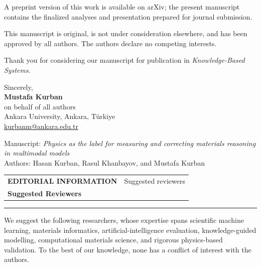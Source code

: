 \documentclass[10pt,a4paper]{article}
\newcommand{\smallcapslabel}[1]{%
  {\fontsize{8.4}{10}\selectfont\bfseries\color{Teal}\MakeUppercase{#1}}%
}
\begin{document}
A preprint version of this work is available on arXiv; the present manuscript
contains the finalized analyses and presentation prepared for journal submission.

This manuscript is original, is not under consideration elsewhere, and has been
approved by all authors. The authors declare no competing interests.

Thank you for considering our manuscript for publication in
\textit{Knowledge-Based Systems}.

\vspace{0.25em}

Sincerely,\\[0.18em]

{\bfseries\color{Navy} Mustafa Kurban}\\[-0.05em]
{\small on behalf of all authors}\\[-0.05em]
{\small Ankara University, Ankara, T\"urkiye}\\[-0.05em]
{\small\href{mailto:kurbanm@ankara.edu.tr}
{kurbanm@ankara.edu.tr}}

\vfill

{\footnotesize\color{Muted}
Manuscript:
\textit{Physics as the label for measuring and correcting materials reasoning in multimodal models}\\
Authors: Hasan Kurban, Rasul Khanbayov, and Mustafa Kurban}


\clearpage

\begin{tabularx}{\textwidth}{@{}X>{\raggedleft\arraybackslash}p{4.4cm}@{}}

\smallcapslabel{Editorial information}
&
{\small\color{Muted} Suggested reviewers}
\\[0.18em]

{\Large\bfseries\color{Navy} Suggested Reviewers}
&
\\

\end{tabularx}

\vspace{0.55em}
{\color{Rule}\rule{\textwidth}{0.7pt}}
\vspace{0.65em}

{\small\color{Ink}
We suggest the following researchers, whose expertise spans scientific machine
learning, materials informatics, artificial-intelligence evaluation,
knowledge-guided modelling, computational materials science, and rigorous
physics-based validation. To the best of our knowledge, none has a conflict of
interest with the authors.}
\end{document}

